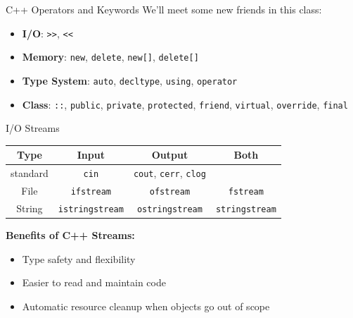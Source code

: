 \begin{frame}[fragile]{C++ Operators and Keywords}
	We'll meet some new friends in this class:
	\begin{itemize}
		\item \textbf{I/O}:  \texttt{>>}, \texttt{<<}
		\item \textbf{Memory}: \texttt{new}, \texttt{delete}, \texttt{new[]}, \texttt{delete[]}
		\item \textbf{Type System}: \texttt{auto}, \texttt{decltype}, \texttt{using}, \texttt{operator}
		\item \textbf{Class}: \texttt{::}, \texttt{public}, \texttt{private}, \texttt{protected}, \texttt{friend}, \texttt{virtual}, \texttt{override}, \texttt{final}
	\end{itemize}
\end{frame}

\begin{frame}[fragile]{I/O Streams}
    \begin{table}[]
        \begin{tabular}{cccc}
            \hline
            \textbf{Type} & \textbf{Input} & \textbf{Output} & \textbf{Both} \\ \hline
            standard & \texttt{cin} & \texttt{cout}, \texttt{cerr}, \texttt{clog} &  \\ \hline
            File         & \texttt{ifstream} & \texttt{ofstream} & \texttt{fstream} \\ \hline
            String       & \texttt{istringstream} & \texttt{ostringstream} & \texttt{stringstream} \\ \hline
        \end{tabular}
    \end{table}

	\textbf{Benefits of C++ Streams:}
	\begin{itemize}
		\item Type safety and flexibility
		\item Easier to read and maintain code
		\item Automatic resource cleanup when objects go out of scope
	\end{itemize}
\end{frame}

